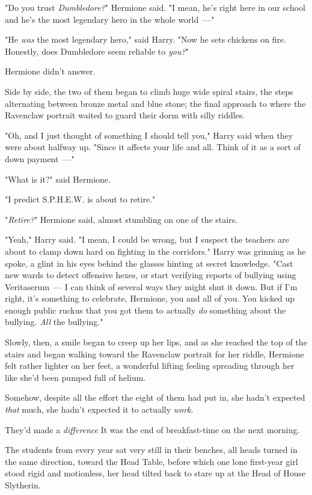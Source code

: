 "Do you trust \emph{Dumbledore?}" Hermione said. "I mean, he's right here in
our school and he's the most legendary hero in the whole world~---"

"He \emph{was} the most legendary hero," said Harry. "Now he sets chickens on
fire. Honestly, does Dumbledore seem reliable to \emph{you?}"

Hermione didn't answer.

Side by side, the two of them began to climb huge wide spiral stairs, the steps
alternating between bronze metal and blue stone; the final approach to where
the Ravenclaw portrait waited to guard their dorm with silly riddles.

"Oh, and I just thought of something I should tell you," Harry said when they
were about halfway up. "Since it affects your life and all. Think of it as a
sort of down payment~---"

"What is it?" said Hermione.

"I predict S.P.H.E.W. is about to retire."

"\emph{Retire?}" Hermione said, almost stumbling on one of the stairs.

"Yeah," Harry said. "I mean, I could be wrong, but I suspect the teachers are
about to clamp down hard on fighting in the corridors." Harry was grinning as
he spoke, a glint in his eyes behind the glasses hinting at secret knowledge.
"Cast new wards to detect offensive hexes, or start verifying reports of
bullying using Veritaserum~--- I can think of several ways they might shut it
down. But if I'm right, it's something to celebrate, Hermione, you and all of
you. You kicked up enough public ruckus that you got them to actually \emph{do}
something about the bullying. \emph{All} the bullying."

Slowly, then, a smile began to creep up her lips, and as she reached the top of
the stairs and began walking toward the Ravenclaw portrait for her riddle,
Hermione felt rather lighter on her feet, a wonderful lifting feeling spreading
through her like she'd been pumped full of helium.

Somehow, despite all the effort the eight of them had put in, she hadn't
expected \emph{that} much, she hadn't expected it to actually \emph{work}.

They'd made a \emph{difference{\el}}
\sbreak
It was the end of breakfast-time on the next morning.

The students from every year sat very still in their benches, all heads turned
in the same direction, toward the Head Table, before which one lone first-year
girl stood rigid and motionless, her head tilted back to stare up at the Head
of House Slytherin.

